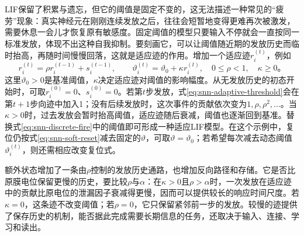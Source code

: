 LIF保留了积累与遗忘，但它的阈值是固定不变的，这无法描述一种常见的“疲劳”现象：真实神经元在刚刚连续发放之后，往往会短暂地变得更难再次被激发，需要休息一会儿才恢复原有敏感度。固定阈值的模型只要输入不停就会一直按同一标准发放，体现不出这种自我抑制。要刻画它，可以让阈值随近期的发放历史而临时抬高，再随时间慢慢回落，这就是适应迹的作用。增加一个适应迹$r_i^{(t)}$，例如
\begin{equation}
  r_i^{(t)}=\rho r_i^{(t-1)}+s_i^{(t-1)},\qquad
  \vartheta_i^{(t)}=\vartheta_0+\kappa r_i^{(t)},
  \quad 0\leq\rho<1,\quad\kappa\geq0\text{。}
  \label{eq:snn-adaptive-threshold}
\end{equation}
这里$\vartheta_0>0$是基准阈值，$\kappa$决定适应迹对阈值的影响幅度。从无发放历史的初态开始时，可取$r_i^{(0)}=0$、$s_i^{(0)}=0$。若第$t$步发放，式\eqref{eq:snn-adaptive-threshold}会在第$t+1$步向迹中加入1；没有后续发放时，这次事件的贡献依次变为$1,\rho,\rho^2,\ldots$。当$\kappa>0$时，过去发放会暂时抬高阈值，适应迹随后衰减，阈值也逐渐回到基准。替换式\eqref{eq:snn-discrete-fire}中的阈值即可形成一种适应LIF模型。在这个示例中，复位仍按式\eqref{eq:snn-soft-reset}减去固定的$\vartheta$，可取$\vartheta=\vartheta_0$；若希望每次减去动态阈值$\vartheta_i^{(t)}$，则还需相应改变复位式。

额外状态增加了一条由$\rho$控制的发放历史通路，也增加反向路径和存储。它是否比原膜电位保留更慢的历史，要比较$\rho$与$\alpha$：在$\kappa>0$且$\rho>\alpha$时，一次发放在适应迹中的贡献比原电位的泄漏因子衰减得更慢，因而可以提供较长的响应时间尺度。若$\kappa=0$，这条迹不改变阈值；若$\rho=0$，它只保留紧邻前一步的发放。较慢的迹提供了保存历史的机制，能否据此完成需要长期信息的任务，还取决于输入、连接、学习和读出。

